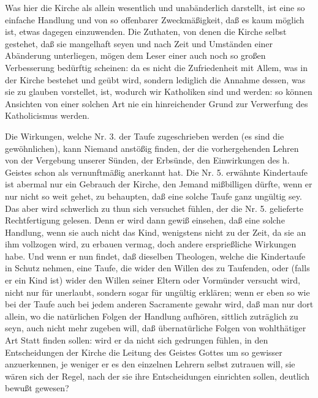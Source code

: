 Was hier die Kirche als allein wesentlich und unabänderlich darstellt, ist eine so einfache Handlung und von so offenbarer Zweckmäßigkeit, daß es kaum möglich ist, etwas dagegen einzuwenden. Die Zuthaten, von denen die Kirche selbst gestehet, daß sie mangelhaft seyen und nach Zeit und Umständen einer Abänderung unterliegen, mögen dem Leser einer auch noch so großen Verbesserung bedürftig scheinen: da es nicht die Zufriedenheit mit Allem, was in der Kirche bestehet und geübt wird, sondern lediglich die Annahme dessen, was sie zu glauben vorstellet, ist, wodurch wir Katholiken sind und werden: so können Ansichten von einer solchen Art nie ein hinreichender Grund zur Verwerfung des Katholicismus werden. \par
Die Wirkungen, welche Nr. 3. der Taufe zugeschrieben werden (es sind die gewöhnlichen), kann Niemand anstößig finden, der die vorhergehenden Lehren von der Vergebung unserer Sünden, der Erbsünde, den Einwirkungen des h. Geistes schon als vernunftmäßig anerkannt hat. Die Nr. 5. erwähnte Kindertaufe ist abermal nur ein Gebrauch der Kirche, den Jemand mißbilligen dürfte, wenn er nur nicht so weit gehet, zu behaupten, daß eine solche Taufe ganz ungültig sey. Das aber wird schwerlich zu thun sich versuchet fühlen, der die  Nr. 5. gelieferte Rechtfertigung gelesen. Denn er wird dann gewiß einsehen, daß eine solche Handlung, wenn sie auch nicht das Kind, wenigstens nicht zu der Zeit, da sie an ihm vollzogen wird, zu erbauen vermag, doch andere ersprießliche Wirkungen habe. Und wenn er nun findet, daß dieselben Theologen, welche die Kindertaufe in Schutz nehmen, eine Taufe, die wider den Willen des zu Taufenden, oder (falls er ein Kind ist) wider den Willen seiner Eltern oder Vormünder versucht wird, nicht nur für unerlaubt, sondern sogar für ungültig erklären; wenn er eben so wie bei der Taufe auch bei jedem anderen Sacramente gewahr wird, daß man nur dort allein, wo die natürlichen Folgen der Handlung aufhören, sittlich zuträglich zu seyn, auch nicht mehr  zugeben will, daß übernatürliche Folgen von wohlthätiger Art Statt finden sollen: wird er da nicht sich gedrungen fühlen, in den Entscheidungen der Kirche die Leitung des Geistes Gottes um so gewisser anzuerkennen, je weniger er es den einzelnen Lehrern selbst zutrauen will, sie wären sich der Regel, nach der sie ihre Entscheidungen einrichten sollen, deutlich bewußt gewesen? \par
